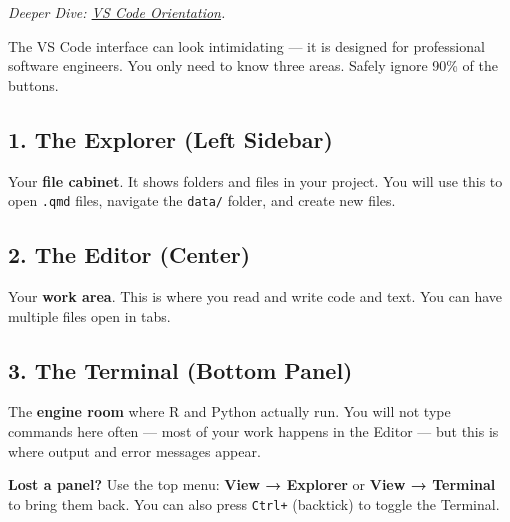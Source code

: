 \documentclass[
  letterpaper,
  DIV=11,
  numbers=noendperiod,
  oneside]{scrreprt}
\begin{document}

\emph{Deeper Dive: \href{workflows05-vscode-orientation.qmd}{VS Code
Orientation}.}

The VS Code interface can look intimidating --- it is designed for
professional software engineers. You only need to know three areas.
Safely ignore 90\% of the buttons.

\subsection*{1. The Explorer (Left
Sidebar)}\label{the-explorer-left-sidebar}

Your \textbf{file cabinet}. It shows folders and files in your project.
You will use this to open \texttt{.qmd} files, navigate the
\texttt{data/} folder, and create new files.

\subsection*{2. The Editor (Center)}\label{the-editor-center}

Your \textbf{work area}. This is where you read and write code and text.
You can have multiple files open in tabs.

\subsection*{3. The Terminal (Bottom
Panel)}\label{the-terminal-bottom-panel}

The \textbf{engine room} where R and Python actually run. You will not
type commands here often --- most of your work happens in the Editor ---
but this is where output and error messages appear.

\begin{tcolorbox}[enhanced jigsaw, title=\textcolor{quarto-callout-tip-color}{\faLightbulb}\hspace{0.5em}{Tip}, arc=.35mm, toptitle=1mm, colframe=quarto-callout-tip-color-frame, toprule=.15mm, leftrule=.75mm, bottomtitle=1mm, opacityback=0, bottomrule=.15mm, coltitle=black, breakable, opacitybacktitle=0.6, titlerule=0mm, colback=white, left=2mm, colbacktitle=quarto-callout-tip-color!10!white, rightrule=.15mm]

\textbf{Lost a panel?} Use the top menu: \textbf{View → Explorer} or
\textbf{View → Terminal} to bring them back. You can also press
\texttt{Ctrl+\textasciigrave{}} (backtick) to toggle the Terminal.

\end{tcolorbox}
\end{document}

